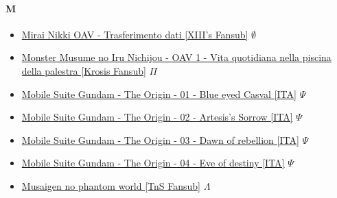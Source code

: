 		\paragraph{M} \hypertarget{OM}{}
			\begin{itemize}
				\item \href{https://mega.nz/#!NSo3kBpb!pyNSHjaUZxJN8-HBdB-eVQUaiVCWxCqPmkOw4eG7-kg} {Mirai Nikki OAV - Trasferimento dati [XIII's Fansub]} $\emptyset$ \\ 
				\item \href{https://mega.nz/#!9HYAVKyC!z6bcYkkR163eSf9pqC2V4KMKdKs32poadHXmmAZgERg} {Monster Musume no Iru Nichijou - OAV 1 - Vita quotidiana nella piscina della palestra [Krosis Fansub]} $\Pi$ \\ 
				\item \href{https://mega.nz/#!tTRnGTzI!wH7iGxdKR4k6ZQHT15R6TTzT69Q8sPX-JKPGPVA2GLE} {Mobile Suite Gundam - The Origin - 01 - Blue eyed Casval  [ITA]} $\Psi$   \\ 
				\item \href{https://mega.nz/#!0C4jDSKT!IbMEXarA-e98YyxBwYhCU40h24JUtqPok3sUWSLp_C0} {Mobile Suite Gundam - The Origin - 02 - Artesis's Sorrow [ITA]} $\Psi$   \\ 
				\item \href{https://mega.nz/#!sT4hwL5L!9FH7Ajz1lF-zoY0S1slz_pDVtuC3FSKp1XMrBP8be_s} {Mobile Suite Gundam - The Origin - 03 - Dawn of rebellion  [ITA]} $\Psi$   \\ 
				\item \href{https://mega.nz/#!gLwRETaQ!O6qmdXNzUqzvQuju8DO-jcKqRS5KGT3wYk03SqFv03A} {Mobile Suite Gundam - The Origin - 04 - Eve of destiny [ITA]} $\Psi$   \\ 
				\item \href{https://mega.nz/#!ZDQmyJ6I!FdBxUIyoeiRSRWJRjRHE4hqRyN-CsPNzvLXiMMbnoU4} {Musaigen no phantom world [TnS Fansub]} $\varLambda$   \\ 
				
				
			\end{itemize}	
		

